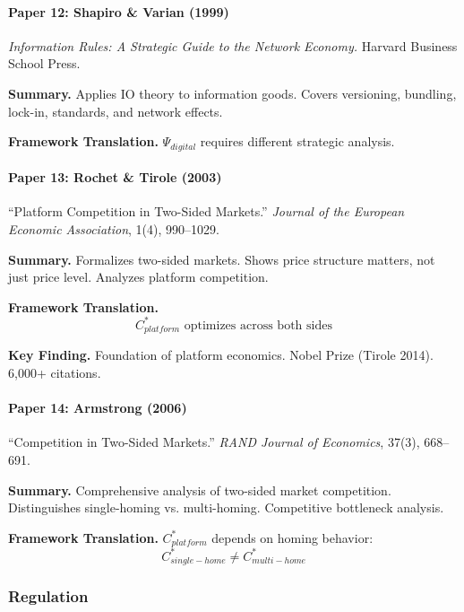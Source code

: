 \paragraph{Paper 12: Shapiro \& Varian (1999)}

\textit{Information Rules: A Strategic Guide to the Network Economy.}
Harvard Business School Press.

\textbf{Summary.}
Applies IO theory to information goods. Covers versioning, bundling, 
lock-in, standards, and network effects.

\textbf{Framework Translation.}
$\Psi_{digital}$ requires different strategic analysis.

\paragraph{Paper 13: Rochet \& Tirole (2003)}

``Platform Competition in Two-Sided Markets.''
\textit{Journal of the European Economic Association}, 1(4), 990--1029.

\textbf{Summary.}
Formalizes two-sided markets. Shows price structure matters, not just 
price level. Analyzes platform competition.

\textbf{Framework Translation.}
\begin{equation}
C^*_{platform} \text{ optimizes across both sides}
\end{equation}

\textbf{Key Finding.}
Foundation of platform economics. Nobel Prize (Tirole 2014). 6,000+ citations.

\paragraph{Paper 14: Armstrong (2006)}

``Competition in Two-Sided Markets.''
\textit{RAND Journal of Economics}, 37(3), 668--691.

\textbf{Summary.}
Comprehensive analysis of two-sided market competition. Distinguishes 
single-homing vs. multi-homing. Competitive bottleneck analysis.

\textbf{Framework Translation.}
$C^*_{platform}$ depends on homing behavior:
\begin{equation}
C^*_{single-home} \neq C^*_{multi-home}
\end{equation}

\subsubsection{Regulation}

